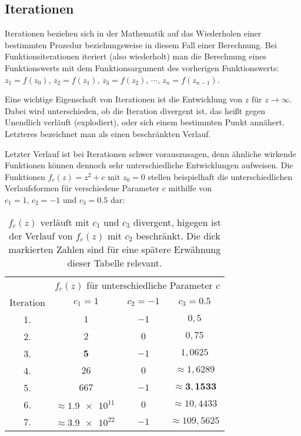 \subsection{Iterationen}\label{subsec:iterations}

Iterationen beziehen sich in der Mathematik auf das Wiederholen einer bestimmten
Prozedur beziehungsweise in diesem Fall einer Berechnung.
Bei Funktionsiterationen iteriert (also wiederholt) man die Berechnung eines
Funktionswerts mit dem Funktionsargument des vorherigen Funktionswerts:
$z_1 = f(z_0),\, z_2 = f(z_1),\, z_3 = f(z_2),\, \cdots,\, z_n = f(z_{n-1})$.

Eine wichtige Eigenschaft von Iterationen ist die Entwicklung von
$z \text{ für } z \to \infty$.
Dabei wird unterschieden, ob die Iteration divergent ist,
das heißt gegen Unendlich verläuft (\glqq explodiert\grqq),
oder sich einem bestimmten Punkt annähert.
Letzteres bezeichnet man als einen beschränkten Verlauf.

Letzter Verlauf ist bei Iterationen schwer vorauszusagen, denn ähnliche wirkende
Funktionen können dennoch sehr unterschiedliche Entwicklungen aufweisen.
Die Funktionen $f_c(z) = z^2 + c \text{ mit } z_0 = 0$ stellen beispielhaft
die unterschiedlichen Verlaufsformen für verschiedene Parameter $c$ mithilfe von
$c_1 = 1 \text{, } c_2 = -1 \text{ und } c_3 = 0.5$ dar:

\begin{table}[h!]
  \centering
  \begin{tabular}{@{}cccc@{}}
    \toprule
    & \multicolumn{3}{c}{$f_c(z)$ für unterschiedliche Parameter $c$} \\
    \cmidrule(lr){2-4}
    Iteration & $ c_1 = 1$ & $ c_2 = -1$ & $ c_3 = 0.5$ \\
    \midrule
    1. & $1$ & $-1$ & $0,5$ \\
    2. & $2$ & $0$ & $0,75$ \\
    3. & $\boldsymbol{5}$ & $-1$ & $1,0625$ \\
    4. & $26$ & $0$ & $\approx 1,6289 $ \\
    5. & $667$ & $-1$ & $\approx \boldsymbol{3,1533} $ \\
    6. & $\approx \num{1,9e11}\ $ & $0$ & $\approx 10,4433 $ \\
    7. & $\approx \num{3,9e22}\ $ & $-1$ & $\approx 109,5625 $ \\
    \bottomrule
  \end{tabular}
  \caption{
    $f_c(z) \text{ verläuft mit } c_1 \text{ und } c_3$ divergent,
    higegen ist der Verlauf von $f_c(z) \text{ mit } c_2$ beschränkt.
    Die dick markierten Zahlen sind für eine spätere Erwähnung dieser Tabelle
    relevant.
  }
  \label{tab:iterations-example}
\end{table}